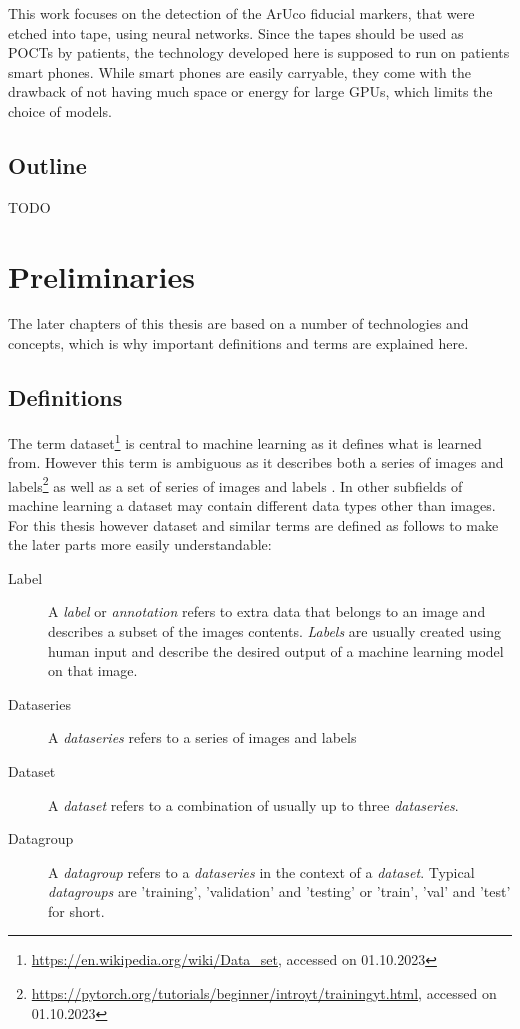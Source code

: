 \documentclass[10pt]{book}
\begin{document}
This work focuses on the detection of the \ac{ArUco} fiducial markers, that were etched into tape, using neural networks. Since the tapes should be used as \acp{POCT} by patients, the technology developed here is supposed to run on patients smart phones. While smart phones are easily carryable, they come with the drawback of not having much space or energy for large \acp{GPU}, which limits the choice of models.


\section{Outline}

TODO

\chapter{Preliminaries}
\label{chap:prelim}

The later chapters of this thesis are based on a number of technologies and concepts, which is why important definitions and terms are explained here.

\section{Definitions}

The term dataset\footnote{\url{https://en.wikipedia.org/wiki/Data_set}, accessed on 01.10.2023} is central to machine learning as it defines what is learned from. However this term is ambiguous as it describes both a series of images and labels\footnote{\url{https://pytorch.org/tutorials/beginner/introyt/trainingyt.html}, accessed on 01.10.2023} as well as a set of series of images and labels \cite{lin2014microsoft}. In other subfields of machine learning a dataset may contain different data types other than images. For this thesis however dataset and similar terms are defined as follows to make the later parts more easily understandable:

\begin{description}
  \item[Label] A \textit{label} or \textit{annotation} refers to extra data that belongs to an image and describes a subset of the images contents. \textit{Labels} are usually created using human input and describe the desired output of a machine learning model on that image.
  \item[Dataseries] A \textit{dataseries} refers to a series of images and labels
  \item[Dataset] A \textit{dataset} refers to a combination of usually up to three \textit{dataseries}.
  \item[Datagroup] A \textit{datagroup} refers to a \textit{dataseries} in the context of a \textit{dataset}. Typical \textit{datagroups} are 'training', 'validation' and 'testing' or 'train', 'val' and 'test' for short.
\end{description}
\end{document}
